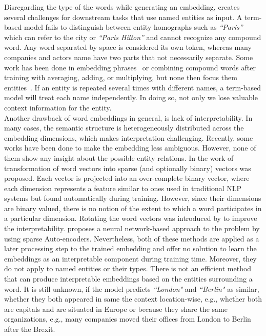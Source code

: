 Disregarding the type of the words while generating an embedding, creates several challenges for downstream tasks that use named entities as input. A term-based model fails to distinguish between entity homographs such as  \emph{``Paris''}  which can refer to the city or \emph{``Paris Hilton''} and cannot recognize any compound word. Any word separated by space is considered its own token, whereas many companies and actors name have two parts that not necessarily separate.  Some work has been done in embedding phrases~ or combining compound words after training with averaging, adding, or multiplying, but none then focus them entities~. If an entity is repeated several times with different names, a term-based model will treat each name independently. In doing so, not only we lose valuable context information for the entity. \\
Another drawback of word embeddings in general, is lack of interpretability. In many cases, the semantic structure is heterogeneously distributed across the embedding dimensions, which makes interpretation challenging. Recently, some works have been done to make the embedding less ambiguous. However, none of them show any insight about the possible entity relations. In the work of  transformation of word vectors into sparse (and optionally binary) vectors was proposed. Each vector is projected into an over-complete binary vector, where each dimension represents a feature similar to ones used in traditional NLP systems but found automatically during training. However, since their dimensions are binary valued, there is no notion of the extent to which a word participates in a particular dimension. Rotating the word vectors was introduced by  to improve the interpretability.   proposes a neural network-based approach to the problem by using sparse Auto-encoders. Nevertheless, both of these methods are applied as a later processing step to the trained embedding and offer no solution to learn the embeddings as an interpretable component during training time. Moreover, they do not apply to named entities or their types. There is not an efficient method that can produce interpretable embeddings based on the entities surrounding a word. It is still unknown, if the model predicts \emph{``London"} and \emph{``Berlin"} as similar, whether they both appeared in same the context location-wise, e.g., whether both are capitals and are situated in Europe or because they share the same organizations, e.g., many companies moved their offices from London to Berlin after the Brexit. 

